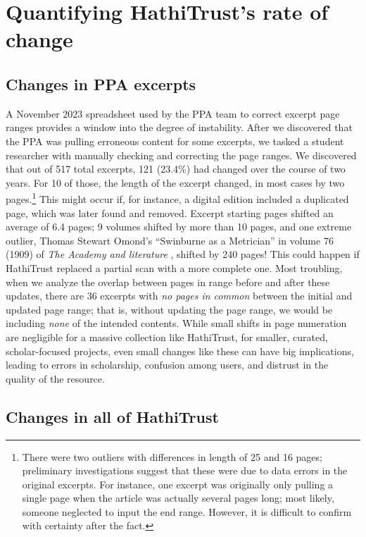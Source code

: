 \documentclass[final]{anthology-ch} %
\begin{document}
\section{Quantifying HathiTrust's rate of change}

\subsection{Changes in PPA excerpts}

A November 2023 spreadsheet used by the PPA team to correct excerpt page ranges provides a window into the degree of instability. After we discovered that the PPA was pulling erroneous content for some excerpts, we tasked a student researcher with manually checking and correcting the page ranges. We discovered that out of 517 total excerpts, 121 (23.4\%) had changed over the course of two years. For 10 of those, the length of the excerpt changed, in most cases by two pages.\footnote{There were two outliers with differences in length of 25 and 16 pages; preliminary investigations suggest that these were due to data errors in the original excerpts. For instance, one excerpt was originally only pulling a single page when the article was actually several pages long; most likely, someone neglected to input the end range. However, it is difficult to confirm with certainty after the fact.} This might occur if, for instance, a digital edition included a duplicated page, which was later found and removed. Excerpt starting pages shifted an average of 6.4 pages; 9 volumes shifted by more than 10 pages, and one extreme outlier, Thomas Stewart Omond's ``Swinburne as a Metrician'' in volume 76 (1909) of \textit{The Academy and literature} \cite{omond_thomas_stewart_swinburne_1909}, shifted by 240 pages! This could happen if HathiTrust replaced a partial scan with a more complete one. Most troubling, when we analyze the overlap between pages in range before and after these updates, there are 36 excerpts with \textit{no pages in common} between the initial and updated page range; that is, without updating the page range, we would be including \textit{none} of the intended contents. While small shifts in page numeration are negligible for a massive collection like HathiTrust, for smaller, curated, scholar-focused projects, even small changes like these can have big implications, leading to errors in scholarship, confusion among users, and distrust in the quality of the resource.

\subsection{Changes in all of HathiTrust}
\end{document}
